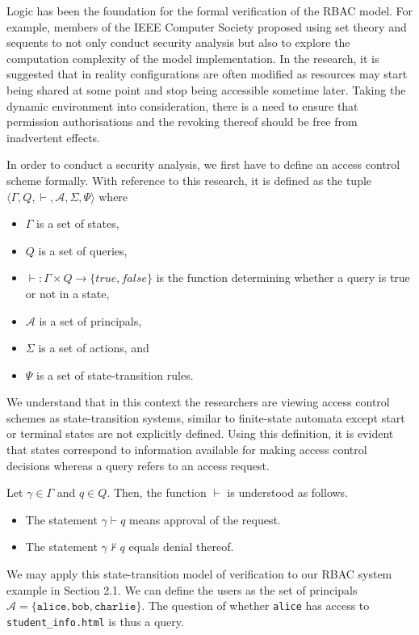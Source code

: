 \documentclass{article}
\begin{document}
Logic has been the foundation for the formal verification of the RBAC model. For example, members of the IEEE Computer Society proposed using set theory and sequents to not only conduct security analysis but also to explore the computation complexity of the model implementation. In the research, it is suggested that in reality configurations are often modified as resources may start being shared at some point and stop being accessible sometime later.\cite{formal-verification} Taking the dynamic environment into consideration, there is a need to ensure that permission authorisations and the revoking thereof should be free from inadvertent effects.

In order to conduct a security analysis, we first have to define an access control scheme formally. With reference to this research, it is defined as the tuple $\langle \Gamma, Q, \vdash, \mathcal{A}, \Sigma, \Psi \rangle$\cite{formal-verification} where
\begin{itemize}
    \item $\Gamma$ is a set of states,
    \item $Q$ is a set of queries,
    \item $\vdash: \Gamma \times Q \to \{ \textit{true}, \textit{false} \}$ is the function determining whether a query is true or not in a state,
    \item $\mathcal{A}$ is a set of principals,
    \item $\Sigma$ is a set of actions, and
    \item $\Psi$ is a set of state-transition rules.
\end{itemize}

We understand that in this context the researchers are viewing access control schemes as state-transition systems, similar to finite-state automata except start or terminal states are not explicitly defined. Using this definition, it is evident that states correspond to information available for making access control decisions whereas a query refers to an access request.

Let $\gamma \in \Gamma$ and $q \in Q$. Then, the function $\vdash$ is understood as follows.
\begin{itemize}
    \item The statement $\gamma \vdash q$ means approval of the request.
    \item The statement $\gamma \nvdash q$ equals denial thereof.
\end{itemize}

We may apply this state-transition model of verification to our RBAC system example in Section 2.1. We can define the users as the set of principals $\mathcal{A} = \{ \texttt{alice}, \texttt{bob}, \texttt{charlie} \}$. The question of whether \texttt{alice} has access to \texttt{student\_info.html} is thus a query.
\end{document}
